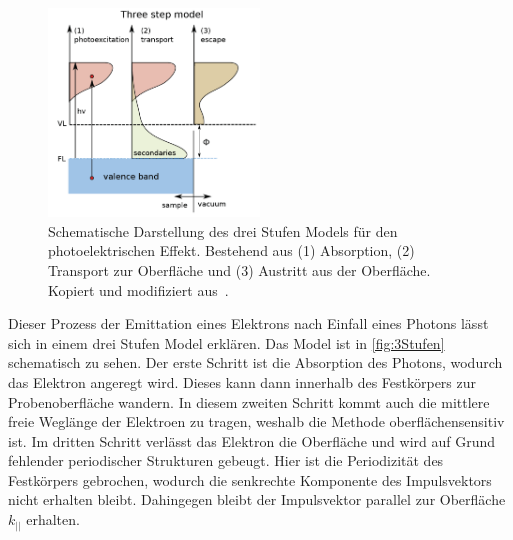         \begin{figure}
            \centering
            \includegraphics[width=0.5\textwidth]{3Stufen}
            \caption{Schematische Darstellung des drei Stufen Models für den photoelektrischen Effekt.
            Bestehend aus (1) Absorption, (2) Transport zur Oberfläche und (3) Austritt aus der Oberfläche.
            Kopiert und modifiziert aus~\cite{zhang_synchrotron_2018}.}
            \label{fig:3Stufen}
        \end{figure}
        Dieser Prozess der Emittation eines Elektrons nach Einfall eines Photons lässt sich in einem drei Stufen Model erklären.
        Das Model ist in \autoref{fig:3Stufen} schematisch zu sehen.
        Der erste Schritt ist die Absorption des Photons, wodurch das Elektron angeregt wird. 
        Dieses kann dann innerhalb des Festkörpers zur Probenoberfläche wandern.
        In diesem zweiten Schritt kommt auch die mittlere freie Weglänge der Elektroen zu tragen, weshalb die Methode oberflächensensitiv ist.
        Im dritten Schritt verlässt das Elektron die Oberfläche und wird auf Grund fehlender periodischer Strukturen gebeugt.
        Hier ist die Periodizität des Festkörpers gebrochen, wodurch die senkrechte Komponente des Impulsvektors nicht erhalten bleibt.
        Dahingegen bleibt der Impulsvektor parallel zur Oberfläche $k_{||}$ erhalten.

